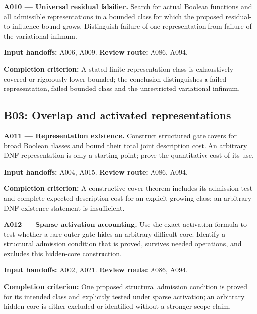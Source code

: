 \documentclass[11pt]{article}
\begin{document}
\textbf{A010 --- Universal residual falsifier.} Search for actual Boolean functions and all admissible representations in a bounded class for which the proposed residual-to-influence bound grows. Distinguish failure of one representation from failure of the variational infimum.

{\small\color{ink}\textbf{Input handoffs:} A006, A009. \textbf{Review route:} A086, A094.\par
\textbf{Completion criterion:} A stated finite representation class is exhaustively covered or rigorously lower-bounded; the conclusion distinguishes a failed representation, failed bounded class and the unrestricted variational infimum.\par}



\subsection{B03: Overlap and activated representations}

\textbf{A011 --- Representation existence.} Construct structured gate covers for broad Boolean classes and bound their total joint description cost. An arbitrary DNF representation is only a starting point; prove the quantitative cost of its use.

{\small\color{ink}\textbf{Input handoffs:} A004, A015. \textbf{Review route:} A086, A094.\par
\textbf{Completion criterion:} A constructive cover theorem includes its admission test and complete expected description cost for an explicit growing class; an arbitrary DNF existence statement is insufficient.\par}



\textbf{A012 --- Sparse activation accounting.} Use the exact activation formula to test whether a rare outer gate hides an arbitrary difficult core. Identify a structural admission condition that is proved, survives needed operations, and excludes this hidden-core construction.

{\small\color{ink}\textbf{Input handoffs:} A002, A021. \textbf{Review route:} A086, A094.\par
\textbf{Completion criterion:} One proposed structural admission condition is proved for its intended class and explicitly tested under sparse activation; an arbitrary hidden core is either excluded or identified without a stronger scope claim.\par}
\end{document}
